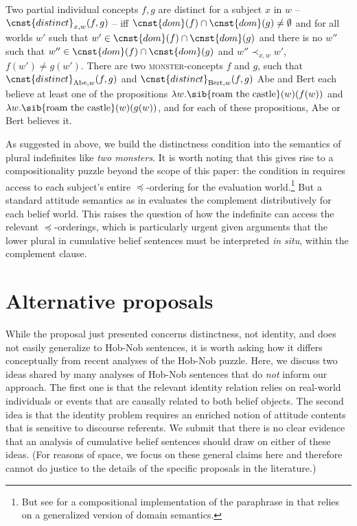\documentclass[output=paper]{langscibook}
\begin{document}
\ea 
\ea \label{sch-has:ex:43} Two partial individual concepts $f, g$ are distinct for a subject $x$ in $w$ -- $\cnst{distinct}_{x, w}(f, g)$ -- iff $\cnst{dom}(f) \cap \cnst{dom}(g) \neq \emptyset$ and for all worlds $w'$ such that $w' \in \cnst{dom}(f) \cap \cnst{dom}(g)$ and there is no $w''$ such that $w'' \in \cnst{dom}(f) \cap \cnst{dom}(g)$ and $w'' \prec_{x, w} w'$, $f(w') \neq g(w')$.
\ex \label{sch-has:ex:44} There are two \textsc{monster}-concepts $f$ and $g$, such that 
\ea \label{sch-has:ex:44a} $\cnst{distinct}_{\text{Abe}, w}(f, g)$ and $\cnst{distinct}_{\text{Bert}, w}(f, g)$ 
\ex Abe and Bert each believe at least one of the propositions $\lambda w.\text{\sib{roam the castle}}(w)(f(w))$ and $\lambda w.\text{\sib{roam the castle}}(w)(g(w))$, \ex and for each of these propositions, Abe or Bert believes it. \z\z\z

\noindent As suggested in  above, we build the distinctness condition  into the semantics of plural indefinites like \textit{two monsters}. It is worth noting that this gives rise to a compositionality puzzle beyond the scope of this paper: the condition in  requires access to each subject's entire $\preceq$-ordering for the evaluation world.\footnote{But see \citet{Haslinger:2020} for a compositional implementation of the paraphrase in  that relies on a generalized version of  domain semantics.} But a standard attitude semantics as in  evaluates the complement distributively for each belief world. This raises the question of how the indefinite can access the relevant $\preceq$-orderings, which is particularly urgent given  arguments that the lower plural in cumulative belief sentences must be interpreted \textit{in situ}, within the complement clause.


\section{Alternative proposals}\label{sch-has:sec:4}

While the proposal just presented concerns distinctness, not identity, and does not easily generalize to Hob-Nob sentences, it is worth asking how it differs conceptually from recent analyses of the Hob-Nob puzzle. Here, we discuss two ideas shared by many analyses of Hob-Nob sentences that do \textit{not} inform our approach. The first one is that the relevant identity relation relies on real-world individuals or events that are causally related to both belief objects. The second idea is that the identity problem requires an enriched notion of attitude contents that is sensitive to discourse referents. We submit that there is no clear evidence that an analysis of cumulative belief sentences should draw on either of these ideas. (For reasons of space, we focus on these general claims here and therefore cannot do justice to the details of the specific proposals in the literature.)
\end{document}
